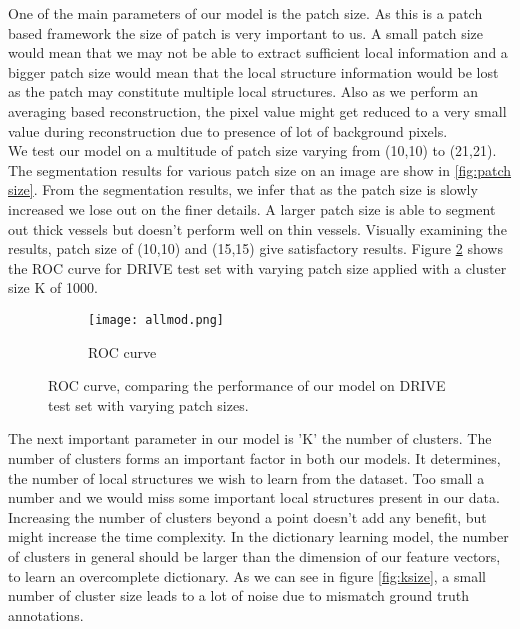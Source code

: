 One of the main parameters of our model is the patch size. As this is a patch based framework the size of patch is very important to us. A small patch size would mean that we may not be able to extract sufficient local information and a bigger patch size would mean that the local structure information would be lost as the patch may constitute multiple local structures. Also as we perform an averaging based reconstruction, the pixel value might get reduced to a very small value during reconstruction due to presence of lot of background pixels.\\ 

We test our model on a multitude of patch size varying from (10,10) to (21,21). The segmentation results for various patch size on an image are show in \ref{fig:patch size}. From the segmentation results, we infer that as the patch size is slowly increased we lose out on the finer details. A larger patch size is able to segment out thick vessels but doesn't perform well on thin vessels. Visually examining the results, patch size of (10,10) and (15,15) give satisfactory results. Figure \ref{fig:patchcompare} shows the ROC curve for DRIVE test set with varying patch size applied with a cluster size K of 1000.\\ 




\begin{figure}
	\centering
	\begin{subfigure}[b]{0.45\textwidth}
		\texttt{[image: allmod.png]}
		\caption{ROC curve}
		\label{fig:patchcom}
	\end{subfigure}
	\caption[ROC curve with varying patch size]{ROC curve, comparing the performance of our model on DRIVE test set with varying patch sizes.}
	\label{fig:patchcompare}
\end{figure}

The next important parameter in our model is 'K' the number of clusters. The number of clusters forms an important factor in both our models. It determines, the number of local structures we wish to learn from the dataset. Too small a number and we would miss some important local structures present in our data. Increasing the number of clusters beyond a point doesn't add any benefit, but might increase the time complexity. In the dictionary learning model, the number of clusters in general should be larger than the dimension of our feature vectors, to learn an overcomplete dictionary. As we can see in figure \ref{fig:ksize}, a small number of cluster size leads to a lot of noise due to mismatch ground truth annotations.


